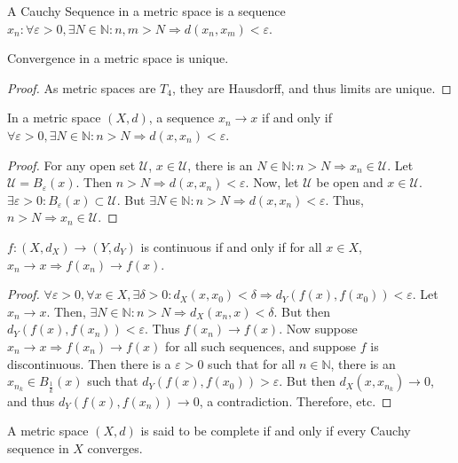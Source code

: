 \documentclass[crop=false,class=article,oneside]{standalone}
\begin{document}
        \begin{definition}
        A Cauchy Sequence in a metric space is a sequence $x_n:\forall \varepsilon>0,\exists N\in \mathbb{N}:n,m>N\Rightarrow d(x_n,x_m)<\varepsilon$.
        \end{definition}
        \begin{corollary}
        Convergence in a metric space is unique.
        \end{corollary}
        \begin{proof}
        As metric spaces are $T_4$, they are Hausdorff, and thus limits are unique.
        \end{proof}
        \begin{theorem}
        In a metric space $(X,d)$, a sequence $x_n\rightarrow x$ if and only if $\forall\varepsilon>0,\exists N\in \mathbb{N}:n>N\Rightarrow d(x,x_n)<\varepsilon$.
        \end{theorem}
        \begin{proof}
        For any open set $\mathcal{U}$, $x\in \mathcal{U}$, there is an $N\in \mathbb{N}:n>N\Rightarrow x_n \in \mathcal{U}$. Let $\mathcal{U}=B_{\varepsilon}(x)$. Then $n>N\Rightarrow d(x,x_n)<\varepsilon$. Now, let $\mathcal{U}$ be open and $x\in \mathcal{U}$. $\exists\varepsilon>0:B_{\varepsilon}(x)\subset \mathcal{U}$. But $\exists N\in \mathbb{N}:n>N\Rightarrow d(x,x_n)<\varepsilon$. Thus, $n>N\Rightarrow x_n\in \mathcal{U}$.
        \end{proof}
        \begin{theorem}
        $f:(X,d_X)\rightarrow (Y,d_Y)$ is continuous if and only if for all $x\in X$, $x_n\rightarrow x \Rightarrow f(x_n)\rightarrow f(x)$.
        \end{theorem}
        \begin{proof}
        $\forall \varepsilon>0,\forall x\in X,\exists \delta>0:d_X(x,x_0)<\delta \Rightarrow d_Y(f(x),f(x_0))<\varepsilon$. Let $x_n \rightarrow x$. Then, $\exists N\in \mathbb{N}:n>N \Rightarrow d_X(x_n,x)<\delta$. But then $d_Y(f(x),f(x_n)) < \varepsilon$. Thus $f(x_n)\rightarrow f(x)$. Now suppose $x_n\rightarrow x \Rightarrow f(x_n)\rightarrow f(x)$ for all such sequences, and suppose $f$ is discontinuous. Then there is a $\varepsilon>0$ such that for all $n\in \mathbb{N}$, there is an $x_{n_k} \in B_{\frac{1}{k}}(x)$ such that $d_Y(f(x),f(x_0))>\varepsilon$. But then $d_X(x,x_{n_k})\rightarrow 0$, and thus $d_Y(f(x),f(x_n))\rightarrow 0$, a contradiction. Therefore, etc.
        \end{proof}
        \begin{definition}
        A metric space $(X,d)$ is said to be complete if and only if every Cauchy sequence in $X$ converges.
        \end{definition}
\end{document}
